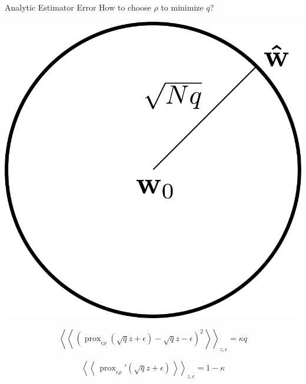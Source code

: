\documentclass[pdf]{beamer}
\DeclareMathOperator{\prox}{prox}
\newcommand{\qav}[1]{\mbox{$\left\langle\left\langle \, #1 \, \right\rangle\right\rangle$}}
\begin{document}



%
\begin{frame}{Analytic Estimator Error}
How to choose $\rho$ to minimize $q$?

    \begin{center}
        \includegraphics[width = .3\linewidth]{errorCircle.pdf}
    \end{center}


    \begin{equation*}
    \qav{\left(\prox_{c\rho}{(\sqrt{q} z + \epsilon)} -\sqrt{q}z -\epsilon\right)^2}_{z,\epsilon}= \kappa q
    \end{equation*}

    \begin{equation*}
    \qav{\prox_{c\rho}'(\sqrt{q}z + \epsilon)}_{z, \epsilon} = 1-\kappa
    \end{equation*}
\end{frame}
\end{document}
